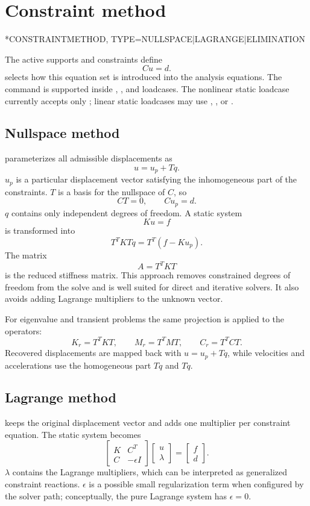 \section{Constraint method}

\begin{syntax}
*CONSTRAINTMETHOD, TYPE=NULLSPACE|LAGRANGE|ELIMINATION
\end{syntax}

The active supports and constraints define
\[
C u = d .
\]
 selects how this equation set is introduced into the analysis equations. The command is supported inside , , and  loadcases. The nonlinear static loadcase currently accepts only ; linear static loadcases may use , , or .

\subsection{Nullspace method}

 parameterizes all admissible displacements as
\[
u = u_p + T q .
\]
\(u_p\) is a particular displacement vector satisfying the inhomogeneous part of the constraints. \(T\) is a basis for the nullspace of \(C\), so
\[
C T = 0,\qquad C u_p = d .
\]
\(q\) contains only independent degrees of freedom. A static system
\[
K u = f
\]
is transformed into
\[
T^T K T q = T^T(f - K u_p).
\]
The matrix
\[
A = T^T K T
\]
is the reduced stiffness matrix. This approach removes constrained degrees of freedom from the solve and is well suited for direct and iterative solvers. It also avoids adding Lagrange multipliers to the unknown vector.

For eigenvalue and transient problems the same projection is applied to the operators:
\[
K_r = T^T K T,\qquad M_r = T^T M T,\qquad C_r = T^T C T .
\]
Recovered displacements are mapped back with \(u=u_p+Tq\), while velocities and accelerations use the homogeneous part \(T\dot q\) and \(T\ddot q\).

\subsection{Lagrange method}

 keeps the original displacement vector and adds one multiplier per constraint equation. The static system becomes
\[
\begin{bmatrix}
K & C^T \\
C & -\epsilon I
\end{bmatrix}
\begin{bmatrix}
u \\
\lambda
\end{bmatrix}
=
\begin{bmatrix}
f \\
d
\end{bmatrix}.
\]
\(\lambda\) contains the Lagrange multipliers, which can be interpreted as generalized constraint reactions. \(\epsilon\) is a possible small regularization term when configured by the solver path; conceptually, the pure Lagrange system has \(\epsilon=0\).

